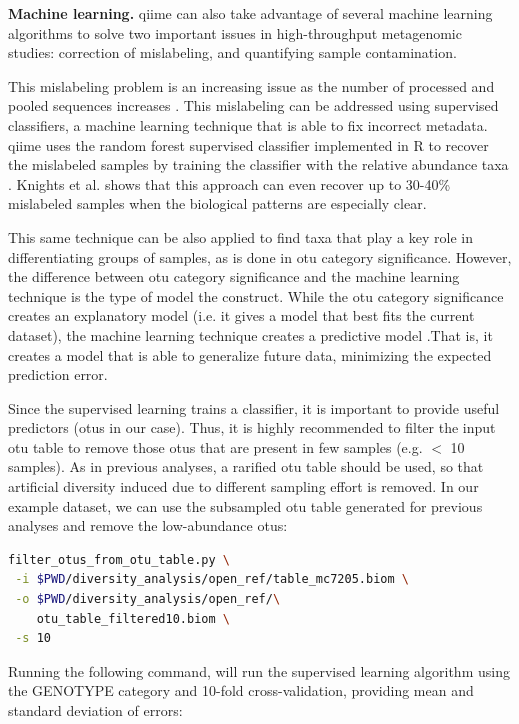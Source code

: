 \textbf{Machine learning.} \gls{qiime} can also take advantage of several machine learning algorithms to solve
two important issues in high-throughput metagenomic studies: correction of mislabeling, and quantifying
sample contamination.

This mislabeling problem is an increasing issue as the number of processed and pooled sequences
increases \cite{Knights2011Mislabel}. This mislabeling can be addressed using supervised classifiers,
a machine learning technique that is able to fix incorrect metadata. \gls{qiime} uses the random forest \cite{Breiman2001}
supervised classifier implemented in R \cite{Liaw2002} to recover the mislabeled samples by training the
classifier with the relative abundance taxa \cite{Knights2011SupClass}. Knights et al. \cite{Knights2011Mislabel}
shows that this approach can even recover up to 30-40\% mislabeled samples when the biological patterns are especially clear.

This same technique can be also applied to find taxa that play a key role in differentiating groups of samples, as
is done in \gls{otu} category significance. However, the difference between \gls{otu} category significance and the machine
learning technique is the type of model the construct. While the \gls{otu} category significance creates an explanatory
model (i.e. it gives a model that best fits the current dataset), the machine learning technique creates a predictive
model \cite{Knights2011SupClass}.That is, it creates a model that is able to generalize future data, minimizing the
expected prediction error.

Since the supervised learning trains a classifier, it is important to provide useful predictors (\gls{otu}s in our case).
Thus, it is highly recommended to filter the input \gls{otu} table to remove those \gls{otu}s that are present in few samples
(e.g. $<$ 10 samples). As in previous analyses, a rarified \gls{otu} table should be used, so that artificial diversity
induced due to different sampling effort is removed. In our example dataset, we can use the subsampled \gls{otu} table
generated for previous analyses and remove the low-abundance \gls{otu}s:

\begin{lstlisting}[language=bash]
filter_otus_from_otu_table.py \
 -i $PWD/diversity_analysis/open_ref/table_mc7205.biom \
 -o $PWD/diversity_analysis/open_ref/\
    otu_table_filtered10.biom \
 -s 10
\end{lstlisting}

Running the following command, will run the supervised learning algorithm using the GENOTYPE
category and 10-fold cross-validation, providing mean and standard deviation of errors:

